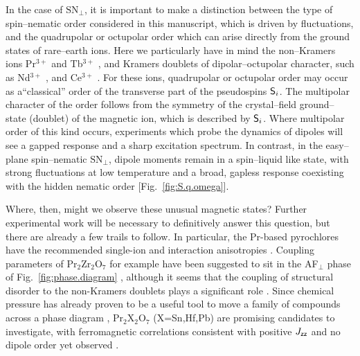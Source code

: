 \documentclass[apsrev4-1,prx,superscriptaddress,floatfix,twocolumn,longbibliography]{revtex4-1}
\begin{document}

In the case of $\text{SN}_\perp$, it is important to make a distinction 
between the type of spin--nematic order considered in this manuscript, 
which is driven by fluctuations, 
and the quadrupolar or octupolar order which can arise directly 
from the ground states of rare--earth ions.
%
Here we particularly have in mind the non--Kramers ions Pr$^{3+}$ 
\cite{Onoda2010,Lee12,petit16-PRB94} and Tb$^{3+}$ 
\cite{Onoda2010,Guitteny2013,taniguchi13,Takatsu16}, 
and Kramers doublets of dipolar--octupolar character, 
such as Nd$^{3+}$ \cite{huang14}, and Ce$^{3+}$ \cite{Li17}.
%
For these ions,
quadrupolar or octupolar order may occur as a``classical'' order 
of the transverse part of the pseudospins ${\sf S}_i$.
%
The multipolar character of the order follows from the symmetry of the crystal--field 
ground--state (doublet) of the magnetic ion, which is described by ${\sf S}_i$.
%
Where multipolar order of this kind occurs, experiments which probe the dynamics
of dipoles will see a gapped response and a sharp excitation spectrum.
%
In contrast, in the easy--plane spin--nematic $\text{SN}_\perp$, 
dipole moments remain in a spin--liquid like state, 
with strong fluctuations at low temperature and a broad, gapless response 
coexisting with the hidden nematic order [Fig.~\ref{fig:S.q.omega}].


Where, then, might we observe these unusual magnetic states? 
%
Further experimental work will be necessary to definitively 
answer this question, but there are already a few trails to follow. 
In particular, the Pr-based pyrochlores have the 
recommended single-ion and interaction 
anisotropies \cite{Onoda2010,Lee12,petit16-PRB94}. 
%
Coupling parameters of Pr$_{2}$Zr$_{2}$O$_{7}$ for example have been suggested 
to sit in the AF$_{\perp}$ phase of Fig.~\ref{fig:phase.diagram} \cite{petit16-PRB94},
although it seems that the coupling of structural disorder to the non-Kramers doublets
plays a significant role \cite{savary17-PRL118,Wen2017,benton-arXiv17,martin-arXiv17}.
%
Since chemical pressure has already proven to be a useful tool to move a 
family of compounds across a phase diagram \cite{dun14a,wiebe15a,jaubert15,hallas16-PRB93.100403,yan17}, 
Pr$_{2}$X$_{2}$O$_{7}$ (X=Sn,Hf,Pb) are promising candidates to investigate, 
with ferromagnetic correlations consistent with positive $J_{\sf zz}$ and no dipole 
order yet observed  \cite{Matsuhira2004,Zhou2008,hallas15,Sibille16a,Anand16a}.
\end{document}
